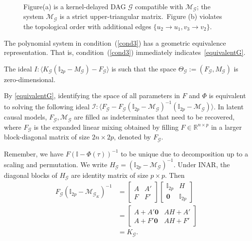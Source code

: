 \documentclass[10pt]{article}
\numberwithin{figure}{section}
\begin{document}
\begin{figure}[t]
\begin{subfigure}[t]{0.3\textwidth}
    \caption{}
\end{subfigure}
\caption{Figure(a) is a kernel-delayed DAG $\mathscr{G}$ compatible with $\mathcal{M}_{\mathscr{G}}$; the system $\mathcal{M}_{\mathscr{G}}$ is a strict upper-triangular matrix.~Figure (b) violates the topological order with additional edges $\{u_2\rightarrow u_1, v_3 \rightarrow v_2\}$.}
\label{GraphM}
\end{figure}

The polynomial system in condition~(\ref{cond3}) has a geometric equivalence representation. That is, condition~(\ref{cond3}) immediately indicates~\autoref{equivalentG}.

\begin{acorollary}\label{equivalentG}
    The ideal $I:\langle K_{\mathscr{G}}(\mathbb{I}_{2p}-M_{\mathscr{G}})-F_{\mathscr{G}} \rangle$ is such that the space $\Theta_{\mathscr{G}}:=(F_{\mathscr{G}},M_{\mathscr{G}})$ is zero-dimensional.
\end{acorollary}

By \autoref{equivalentG}, identifying the space of all parameters in $F$ and $\Phi$ is equivalent to solving the following ideal $\mathcal{I}:\langle F_{\mathscr{G}} - F_{\mathscr{G}}(\mathbb{I}_{2p}-\mathcal{M}_{\mathscr{G}})^{-1}(\mathbb{I}_{2p}-\mathcal{M}_{\mathscr{G}})\rangle$.  In latent causal models, $F_{\mathscr{G}},\mathcal{M}_{\mathscr{G}}$ are filled as indeterminates that need to be recovered, where $F_{\mathscr{G}}$ is the expanded linear mixing obtained by filling $F \in \mathbb{R}^{n\times p}$ in a larger block-diagonal matrix of size $2n\times 2p$, denoted by $F_{\mathscr{G}}$. 

Remember, we have  $F(\mathbb{I}-\Phi(\tau))^{-1}$ to be unique due to decomposition up to a scaling and permutation. We write $H_{\mathscr{G}}=(\mathbb{I}_{2p}-\mathcal{M}_{\mathscr{G}})^{-1}$. Under INAR, the diagonal blocks of $ H_{\mathscr{G}}$ are identity matrix of size $p\times p$. Then
\begin{align*}
F_{\mathscr{G}}(\mathbb{I}_{2p}-\mathcal{M}_{\mathscr{G}_K})^{-1}&=\begin{bmatrix}
A & A'\\
F & F'
\end{bmatrix}\begin{bmatrix}
\mathbb{I}_{2p} & H\\
\mathbf{0}& \mathbb{I}_{2p}
\end{bmatrix}\\
&=\begin{bmatrix}
A+ A'\mathbf{0} & AH+ A'\\
A + F'\mathbf{0}&  AH+F'
\end{bmatrix}\\
&= K_{\mathscr{G}}.
\end{align*}
\end{document}
